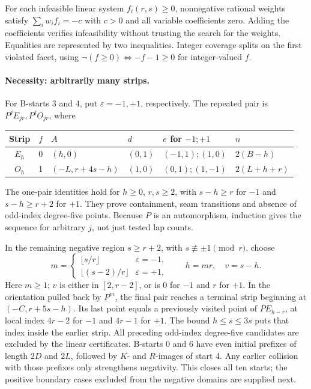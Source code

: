 \documentclass[11pt]{amsart}
\newcommand{\claimid}[1]{}
\theoremstyle{definition}\newtheorem{definition}[theorem]{Definition}
\begin{document}
For each infeasible linear system $f_i(r,s)\ge0$, nonnegative rational
weights satisfy $\sum_iw_if_i=-c$ with $c>0$ and all variable
coefficients zero. Adding the coefficients verifies infeasibility
without trusting the search for the weights. Equalities are represented
by two inequalities. Integer coverage splits on the first violated
facet, using $\neg(f\ge0)\iff -f-1\ge0$ for integer-valued $f$.

\paragraph{Necessity: arbitrarily many strips.}
For B-starts 3 and 4, put $\varepsilon=-1,+1$, respectively.
The repeated pair is $P^jE_{jr},P^jO_{jr}$, where
\begin{center}\small
\begin{tabular}{ccllll}\toprule
Strip & $f$ & $A$ & $d$ & $e$ for $-1;+1$ & $n$\\\midrule
$E_h$ &0&$(h,0)$&$(0,1)$&$(-1,1);(1,0)$&$2(B-h)$\\
$O_h$ &1&$(-L,r+4s-h)$&$(1,0)$&$(0,1);(1,-1)$&$2(L+h+r)$\\\bottomrule
\end{tabular}
\end{center}
The one-pair identities hold for $h\ge0$, $r,s\ge2$, with
$s-h\ge r$ for $-1$ and $s-h\ge r+2$ for $+1$.
They prove containment, seam transitions and absence of odd-index
degree-five points. Because $P$ is an automorphism, induction gives
the sequence for arbitrary $j$, not just tested lap counts.

In the remaining negative region $s\ge r+2$, with
$s\not\equiv\pm1\pmod r$, choose
\[
 m=\begin{cases}\lfloor s/r\rfloor&\varepsilon=-1,\\
                  \lfloor(s-2)/r\rfloor&\varepsilon=+1,
   \end{cases}\qquad h=mr,\quad v=s-h.
\]
Here $m\ge1$; $v$ is either in $[2,r-2]$, or is $0$ for $-1$
and $r$ for $+1$. In the orientation pulled back by $P^m$, the final
pair reaches a terminal strip beginning at $(-C,r+5s-h)$.
Its last point equals a previously visited point of $PE_{h-r}$,
at local index $4r-2$ for $-1$ and $4r-1$ for $+1$.
The bound $h\le s\le3s$ puts that index inside the earlier strip.
All preceding odd-index degree-five candidates are excluded by the
linear certificates. B-starts 0 and 6 have even initial prefixes of
length $2D$ and $2L$, followed by $K$- and $R$-images of start 4.
Any earlier collision with those prefixes only strengthens negativity.
This closes all ten starts; the positive boundary cases excluded from
the negative domains are supplied next.
\claimid{prop:route_b-necessity}
\end{document}
